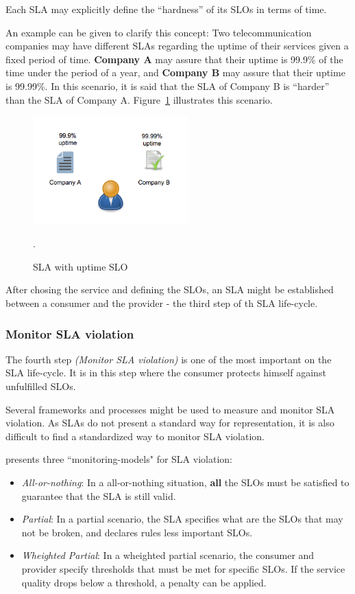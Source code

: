 Each SLA may explicitly define the ``hardness'' of its SLOs in terms of time. 

An example can be given to clarify this concept: Two telecommunication companies may have different SLAs regarding the uptime of their services given a fixed period of time. \textbf{Company A} may assure that their uptime is 99.9\% of the time under the period of a year, and \textbf{Company B} may assure that their uptime is 99.99\%. In this scenario, it is said that the SLA of Company B is ``harder'' than the SLA of Company A. Figure~\ref{fig:sla-agreement} illustrates this scenario.

\begin{figure}[ht!]
\centering
\includegraphics[width=60mm]{Imagens/sla-agreement.png}
\caption{SLA with uptime SLO}.\label{fig:sla-agreement}
\end{figure}

After chosing the service and defining the SLOs, an SLA might be established between a consumer and the provider - the third step of th SLA life-cycle. 

\subsubsection{Monitor SLA violation}
The fourth step \textit{(Monitor SLA violation)} is one of the most important on the SLA life-cycle. It is in this step where the consumer protects himself against unfulfilled SLOs. 

Several frameworks and processes might be used to measure and monitor SLA violation. As SLAs do not present a standard way for representation, it is also difficult to find a standardized way to monitor SLA violation. 

\cite{ranna2008} presents three ``monitoring-models" for SLA violation: 

\begin{itemize}
   \item{\textit{All-or-nothing}: In a all-or-nothing situation, \textbf{all} the SLOs must be satisfied to guarantee that the SLA is still valid.}
   \item{\textit{Partial}: In a partial scenario, the SLA specifies what are the SLOs that may not be broken, and declares rules less important SLOs.}
   \item{\textit{Wheighted Partial}: In a wheighted partial scenario, the consumer and provider specify thresholds that must be met for specific SLOs. If the service quality drops below a threshold, a penalty can be applied. 
}

\end{itemize}

